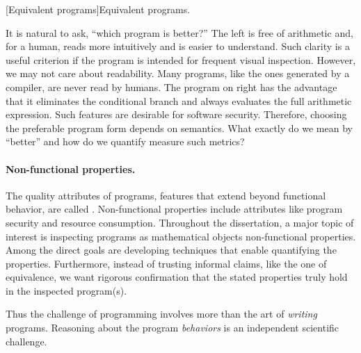 \begin{center}
\captionsetup{type=lstlisting}
\begin{minipage}{.3\textwidth}

\end{minipage}%
\hspace{5em}%
\begin{minipage}{.4\textwidth}
\captionsetup{type=lstlisting}

\end{minipage}
[Equivalent programs]{Equivalent programs.}
\label{lst:intro}
\end{center}

It is natural to ask, \enquote{which program is better?}
The left is free of arithmetic and, for a human, reads more intuitively and is easier to understand.
Such clarity is a useful criterion if the program is intended for frequent visual inspection.
However, we may not care about readability.
Many programs, like the ones generated by a compiler, are never read by humans.
The program on right has the advantage that it eliminates the conditional branch and always evaluates the full arithmetic expression.
Such features are desirable for software security.
Therefore, choosing the preferable program form depends on semantics.
What exactly do we mean by \enquote{better} and how do we quantify measure such metrics?

\paragraph{Non-functional properties.}
The quality attributes of programs, \ie features that extend beyond functional behavior, are called \emph{}.
Non-functional properties include attributes like program security and resource consumption.
Throughout the dissertation, a major topic of interest is inspecting programs as mathematical objects \wrt non-functional properties.
Among the direct goals are developing techniques that enable quantifying the properties.
Furthermore, instead of trusting informal claims, like the one of equivalence, we want rigorous confirmation that the stated properties truly hold in the inspected program(s).

\vspace{1em}\noindent{}Thus the challenge of programming involves more than the art of \emph{writing} programs. Reasoning about the program \emph{behaviors} is an independent scientific challenge.

